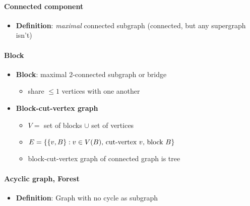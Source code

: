 \paragraph{Connected component}
\begin{itemize}
  \item \textbf{Definition}: \emph{maximal} connected subgraph (connected, but any supergraph isn't)
\end{itemize}

\paragraph{Block}
\begin{itemize}
  \item \textbf{Block}: maximal $ 2 $-connected subgraph or bridge
  \begin{itemize}
     \item share $ \leq 1 $ vertices with one another 
   \end{itemize} 
   \item \textbf{Block-cut-vertex graph}
   \begin{itemize}
     \item $ V = $ set of blocks $ \cup $ set of vertices
     \item $ E = \{ \{ v,B \} : v \in V(B) \text{, cut-vertex $ v $, block $ B $} \} $ 
     \item block-cut-vertex graph of connected graph is tree
   \end{itemize}
\end{itemize}

\paragraph{Acyclic graph, Forest}
\begin{itemize}
  \item \textbf{Definition}: Graph with no cycle as subgraph
\end{itemize}

